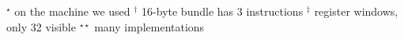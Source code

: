 \begin{sidewaystable}[tbp]
\begin{sf}
\begin{footnotesize}
\begin{center}
\begin{tabular}{|c|c||c|c|c|c|c|c|c|c|c|c|c|}
\hline

\end{tabular}

$^{\star}$ on the machine we used \hspace{2em}$^{\dagger}$ 16-byte bundle has 3 instructions
\hspace{3em}$^{\ddagger}$ register windows, only 32 visible
\hspace{2em}$^{\star\star}$ many implementations
\end{center}
\end{footnotesize}
\end{sf}
\end{sidewaystable}
